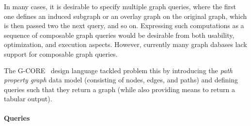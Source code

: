 
In many cases, it is desirable to specify multiple graph queries, where the
first one defines an induced subgraph or an overlay graph on the original graph,
which is then passed two the next query, and so on. Expressing such computations
as a sequence of composable graph queries would be desirable from both
usability, optimization, and execution aspects. However, currently many graph
dabases lack support for composable graph queries.

The \mbox{G-CORE}~\cite{DBLP:conf/sigmod/AnglesABBFGLPPS18} design language
tackled problem this by introducing the \emph{path property graph} data model
(consisting of nodes, edges, and paths) and defining queries such that they
return a graph (while also providing means to return a tabular output).


\paragraph{Queries}
{\raggedright
}